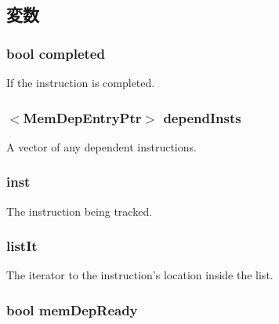 \subsection{変数}
\hypertarget{classMemDepUnit_1_1MemDepEntry_a8c06e370b709d689e392a4b7b53b47c5}{
\subsubsection[{completed}]{\setlength{\rightskip}{0pt plus 5cm}bool {\bf completed}}}
\label{classMemDepUnit_1_1MemDepEntry_a8c06e370b709d689e392a4b7b53b47c5}
If the instruction is completed. \hypertarget{classMemDepUnit_1_1MemDepEntry_acb5f13b3085f8fd62136e9118aaa8e81}{
\subsubsection[{dependInsts}]{$<${\bf MemDepEntryPtr}$>$ {\bf dependInsts}}}
\label{classMemDepUnit_1_1MemDepEntry_acb5f13b3085f8fd62136e9118aaa8e81}
A vector of any dependent instructions. \hypertarget{classMemDepUnit_1_1MemDepEntry_af5d4fb974eeb4507d4c837d365d0cefc}{
\subsubsection[{inst}]{ {\bf inst}}}
\label{classMemDepUnit_1_1MemDepEntry_af5d4fb974eeb4507d4c837d365d0cefc}
The instruction being tracked. \hypertarget{classMemDepUnit_1_1MemDepEntry_ac8188604da9551279a59cfbbc6683fdb}{
\subsubsection[{listIt}]{ {\bf listIt}}}
\label{classMemDepUnit_1_1MemDepEntry_ac8188604da9551279a59cfbbc6683fdb}
The iterator to the instruction's location inside the list. \hypertarget{classMemDepUnit_1_1MemDepEntry_a1f5ab91d27c3ebd7a0bdc85c87030126}{
\subsubsection[{memDepReady}]{\setlength{\rightskip}{0pt plus 5cm}bool {\bf memDepReady}}}
